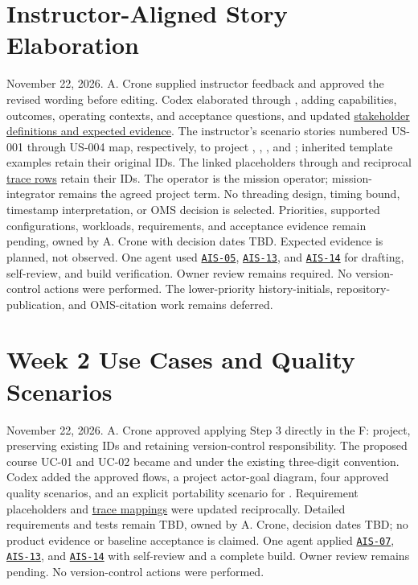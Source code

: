 \section{Instructor-Aligned Story Elaboration}
November 22, 2026. A. Crone supplied instructor feedback and approved the
revised wording before editing. Codex elaborated
 through , adding capabilities,
outcomes, operating contexts, and acceptance questions, and updated
\hyperref[Table:StakeholderDefinitions]{stakeholder definitions and expected evidence}.
The instructor's scenario stories numbered US-001 through US-004 map,
respectively, to project , ,
, and ; inherited template examples
retain their original IDs. The linked placeholders
 through  and reciprocal
\hyperref[Table:TraceabilityMatrix]{trace rows} retain their IDs.
The operator is the mission operator; mission-integrator remains the agreed
project term. No threading design, timing bound, timestamp interpretation,
or OMS decision is selected. Priorities, supported configurations, workloads,
requirements, and acceptance evidence remain pending, owned by A. Crone
with decision dates TBD. Expected evidence is planned, not observed.
One agent used \hyperref[Skill:AIS-05]{\texttt{AIS-05}},
\hyperref[Skill:AIS-13]{\texttt{AIS-13}}, and
\hyperref[Skill:AIS-14]{\texttt{AIS-14}} for drafting, self-review, and build
verification. Owner review remains required. No version-control actions
were performed. The lower-priority history-initials, repository-publication,
and OMS-citation work remains deferred.

\section{Week 2 Use Cases and Quality Scenarios}
November 22, 2026. A. Crone approved applying Step 3 directly in the F: project,
preserving existing IDs and retaining version-control responsibility.
The proposed course UC-01 and UC-02 became  and
 under the existing three-digit convention.
Codex added the approved flows, a project actor-goal diagram, four approved
quality scenarios, and an explicit portability scenario for
. Requirement placeholders and
\hyperref[Table:TraceabilityMatrix]{trace mappings} were updated reciprocally.
Detailed requirements and tests remain TBD, owned by A. Crone, decision
dates TBD; no product evidence or baseline acceptance is claimed.
One agent applied \hyperref[Skill:AIS-07]{\texttt{AIS-07}},
\hyperref[Skill:AIS-13]{\texttt{AIS-13}}, and
\hyperref[Skill:AIS-14]{\texttt{AIS-14}} with self-review and a complete build.
Owner review remains pending. No version-control actions were performed.


